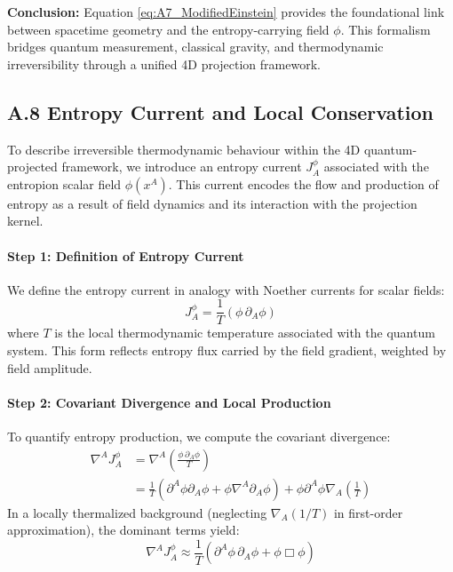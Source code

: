 \documentclass[12pt]{article}
\begin{document}
\textbf{Conclusion:}  
Equation \eqref{eq:A7_ModifiedEinstein} provides the foundational link between spacetime geometry and the entropy-carrying field \(\phi\). This formalism bridges quantum measurement, classical gravity, and thermodynamic irreversibility through a unified 4D projection framework.



\subsection*{A.8 \quad Entropy Current and Local Conservation}
\label{eq:A8}

To describe irreversible thermodynamic behaviour within the 4D quantum-projected framework, we introduce an entropy current \(J_A^\phi\) associated with the entropion scalar field \(\phi(x^A)\). This current encodes the flow and production of entropy as a result of field dynamics and its interaction with the projection kernel.

\paragraph{Step 1: Definition of Entropy Current}

We define the entropy current in analogy with Noether currents for scalar fields:
\begin{equation}
J_A^\phi = \frac{1}{T} \left( \phi\, \partial_A \phi \right)
\label{eq:A8_EntropyCurrent}
\end{equation}
where \(T\) is the local thermodynamic temperature associated with the quantum system. This form reflects entropy flux carried by the field gradient, weighted by field amplitude.

\paragraph{Step 2: Covariant Divergence and Local Production}

To quantify entropy production, we compute the covariant divergence:
\begin{align}
\nabla^A J_A^\phi &= \nabla^A \left( \frac{\phi\, \partial_A \phi}{T} \right) \nonumber \\
&= \frac{1}{T} \left( \partial^A \phi \partial_A \phi + \phi \nabla^A \partial_A \phi \right) + \phi \partial^A \phi \nabla_A \left( \frac{1}{T} \right)
\label{eq:A8_CovDiv}
\end{align}
In a locally thermalized background (neglecting \(\nabla_A (1/T)\) in first-order approximation), the dominant terms yield:
\begin{equation}
\nabla^A J_A^\phi \approx \frac{1}{T} \left( \partial^A \phi\, \partial_A \phi + \phi \Box \phi \right)
\label{eq:A8_EntropyRate}
\end{equation}
\end{document}
